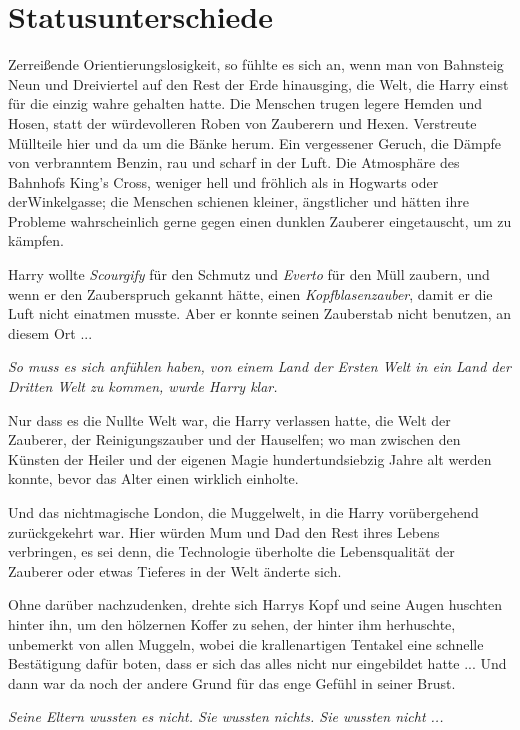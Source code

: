 \chapter{Statusunterschiede}

Zerreißende Orientierungslosigkeit, so fühlte es sich an, wenn man von Bahnsteig
Neun und Dreiviertel auf den Rest der Erde hinausging, die Welt, die Harry einst
für die einzig wahre gehalten hatte. Die Menschen trugen legere Hemden und
Hosen, statt der würdevolleren Roben von Zauberern und Hexen. Verstreute
Müllteile hier und da um die Bänke herum. Ein vergessener Geruch, die Dämpfe von
verbranntem Benzin, rau und scharf in der Luft. Die Atmosphäre des Bahnhofs
King's Cross, weniger hell und fröhlich als in Hogwarts oder derWinkelgasse; die
Menschen schienen kleiner, ängstlicher und hätten ihre Probleme wahrscheinlich
gerne gegen einen dunklen Zauberer eingetauscht, um zu kämpfen.

Harry wollte \glqq{}\emph{Scourgify}\grqq{} für den Schmutz und \glqq{}
\emph{Everto}\grqq{} für den Müll zaubern, und wenn er den Zauberspruch gekannt
hätte, einen \glqq{}\emph{Kopfblasenzauber}\grqq{}, damit er die Luft nicht
einatmen musste. Aber er konnte seinen Zauberstab nicht benutzen, an diesem
Ort ...

\emph{So muss es sich anfühlen haben, von einem Land der Ersten Welt in ein
Land der Dritten Welt zu kommen, wurde Harry klar.}

Nur dass es die Nullte Welt war, die Harry verlassen hatte, die Welt der
Zauberer, der Reinigungszauber und der Hauselfen; wo man zwischen den Künsten
der Heiler und der eigenen Magie hundertundsiebzig Jahre alt werden konnte,
bevor das Alter einen wirklich einholte.

Und das nichtmagische London, die Muggelwelt, in die Harry vorübergehend
zurückgekehrt war. Hier würden Mum und Dad den Rest ihres Lebens verbringen, es
sei denn, die Technologie überholte die Lebensqualität der Zauberer oder etwas
Tieferes in der Welt änderte sich.

Ohne darüber nachzudenken, drehte sich Harrys Kopf und seine Augen huschten
hinter ihn, um den hölzernen Koffer zu sehen, der hinter ihm herhuschte,
unbemerkt von allen Muggeln, wobei die krallenartigen Tentakel eine schnelle
Bestätigung dafür boten, dass er sich das alles nicht nur eingebildet hatte ...
Und dann war da noch der andere Grund für das enge Gefühl in seiner Brust.

\emph{Seine Eltern wussten es nicht. Sie wussten nichts. Sie wussten nicht ...}

